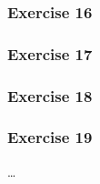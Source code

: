 \documentclass[
]{article}
\begin{document}
\hypertarget{exercise-16}{%
\subsubsection{Exercise 16}\label{exercise-16}}

\hypertarget{exercise-17}{%
\subsubsection{Exercise 17}\label{exercise-17}}

\hypertarget{exercise-18}{%
\subsubsection{Exercise 18}\label{exercise-18}}

\hypertarget{exercise-19}{%
\subsubsection{Exercise 19}\label{exercise-19}}

\ldots{}
\end{document}

